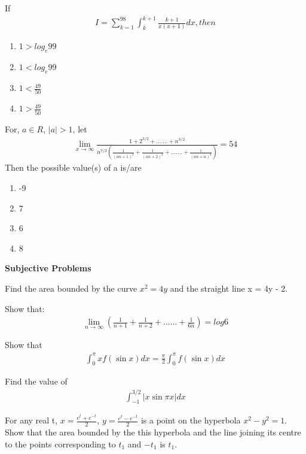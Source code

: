\item If 
\begin{align*}
I = \sum_{k = 1}^{98}\int_{k}^{k + 1}\frac{k + 1}{x(x + 1)}dx, then
\end{align*}
\begin{enumerate}
\item $1 > log_e99$
\item $1 < log_e99$
\item $1 < \frac{49}{50}$
\item $1 > \frac{49}{50}$
\end{enumerate}

\item For, $a \in R$, $|a| > 1$, let
\begin{align*}
\lim_{x \to \infty}\frac{1 + 2^{3/2} + .......+ n^{3/2}}{n^{7/3}(\frac{1}{(an + 1)^2} + \frac{1}{(an + 2)^2}+.......+\frac{1}{(an + n)^2})} = 54
\end{align*}
Then the possible value(s) of a is/are
\begin{enumerate}
\item -9
\item 7
\item 6
\item 8
\end{enumerate}

\textbf{Subjective Problems}

\item Find the area bounded by the curve $x^2 = 4y$ and the straight line x = 4y - 2.

\item Show that:
\begin{align*}
\lim_{n \to \infty}(\frac{1}{n + 1} + \frac{1}{n + 2}+......+\frac{1}{6n}) = log 6
\end{align*}

\item Show that
\begin{align*}
\int_{0}^{\pi}xf(\sin x)dx = \frac{\pi}{2}\int_{0}^{\pi}f(\sin x)dx
\end{align*}

\item Find the value of
\begin{align*}
\int_{-1}^{3/2}|x \sin \pi x|dx
\end{align*}

\item For any real t, $x = \frac{e^t + e^{-t}}{2}$, $y = \frac{e^t - e^{-t}}{2}$ is a point on the hyperbola $x^2 - y^2 = 1$. Show that the area bounded by the this hyperbola and the line joining its centre to the points corresponding to $t_1$ and $-t_1$ is $t_1$.

